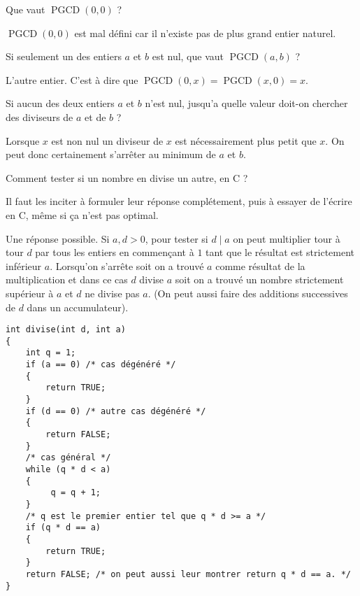 \begin{newenu}
\item Que vaut $\operatorname{PGCD}(0, 0)$ ?
  \begin{correction}
    $\operatorname{PGCD}(0, 0)$ est mal défini car il n'existe pas de plus grand entier naturel.
  \end{correction}
\item Si seulement un des entiers $a$ et $b$ est nul, que vaut $\operatorname{PGCD}(a, b)$ ?
  \begin{correction}
    L'autre entier. C'est à dire que  $\operatorname{PGCD}(0, x) =  \operatorname{PGCD}(x, 0) = x$.
  \end{correction}
\item Si aucun des deux entiers $a$ et $b$ n'est nul, jusqu'a quelle valeur doit-on chercher des diviseurs de $a$ et de $b$ ?

  \begin{correction}
    Lorsque $x$ est non nul un diviseur de $x$ est nécessairement plus petit que $x$.  On peut donc certainement s'arrêter au minimum de $a$ et $b$.
  \end{correction}
\item Comment tester si un nombre en divise un autre, en C ?
  \begin{correction}
Il faut les inciter à formuler leur réponse complétement, puis à essayer de l'écrire en C, même si ça n'est pas optimal.

Une réponse possible.
    Si $a, d > 0$, pour tester si $d \mid a$ on peut multiplier tour à tour $d$ par tous les entiers en commençant à $1$ tant que le résultat est strictement inférieur $a$. Lorsqu'on s'arrête soit on a trouvé $a$ comme résultat de la multiplication et dans ce cas $d$ divise $a$ soit on a trouvé un nombre strictement supérieur à $a$ et $d$ ne divise pas $a$. (On peut aussi faire des additions successives de $d$ dans un accumulateur).

\begin{verbatim}
int divise(int d, int a)
{
    int q = 1;
    if (a == 0) /* cas dégénéré */
    {
        return TRUE;
    }
    if (d == 0) /* autre cas dégénéré */
    {
        return FALSE;
    }
    /* cas général */
    while (q * d < a)
    {
         q = q + 1;
    }
    /* q est le premier entier tel que q * d >= a */
    if (q * d == a)
    {
        return TRUE;
    }
    return FALSE; /* on peut aussi leur montrer return q * d == a. */
}
\end{verbatim}


\end{correction}
\end{newenu}
